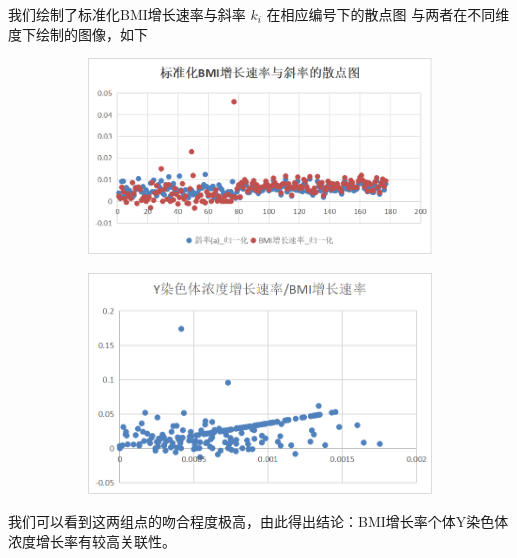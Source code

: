 \documentclass{article}
\begin{document}
我们绘制了标准化BMI增长速率与斜率 $k_i$ 在相应编号下的散点图
与两者在不同维度下绘制的图像，如下
\begin{figure}[H]
    \centering
    \begin{subfigure}[b]{0.45\textwidth}  %
        \centering
        \includegraphics[width=\textwidth]{graph/biaozhunhua.png}  %
        \label{fig:sub1}  %
    \end{subfigure}
    \hspace{0.05\textwidth}  %
    \begin{subfigure}[b]{0.45\textwidth}
        \centering
        \includegraphics[width=\textwidth]{graph/erwei.png}
        \label{fig:sub2}
    \end{subfigure}
    \label{fig:two}  %
\end{figure}
我们可以看到这两组点的吻合程度极高，由此得出结论：BMI增长率个体Y染色体浓度增长率有较高关联性。
\end{document}
